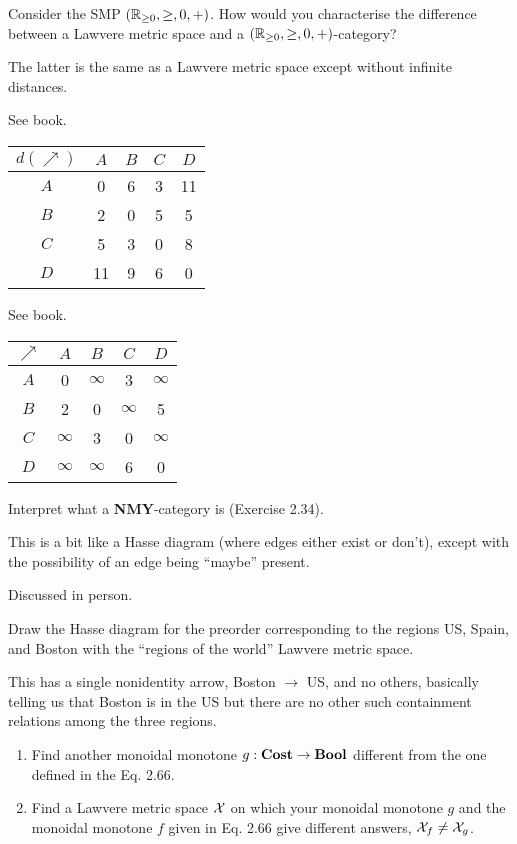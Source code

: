 Consider the SMP $(\mathbb{R}_{\geq0},\geq,0,+)$.  How would you characterise the difference between a Lawvere metric space and a $(\mathbb{R}_{\geq0},\geq,0,+)$-category?

\solution
The latter is the same as a Lawvere metric space except without infinite distances.

See book.

\solution
\begin{tabular}{c|cccc}
$d(\nearrow)$ & $A$ & $B$ & $C$ & $D$ \\
\hline$A$ & 0 & 6 & 3 & 11 \\
$B$ & 2 & 0 & 5 & 5 \\
$C$ & 5 & 3 & 0 & 8 \\
$D$ & 11 & 9 & 6 & 0
\end{tabular}

See book.

\solution
\begin{tabular}{c|cccc}
$\nearrow$ & $A$ & $B$ & $C$ & $D$ \\
\hline$A$ & 0 & $\infty$ & 3 & $\infty$ \\
$B$ & 2 & 0 & $\infty$ & 5 \\
$C$ & $\infty$ & 3 & 0 & $\infty$ \\
$D$ & $\infty$ & $\infty$ & 6 & 0
\end{tabular}

Interpret what a \textbf{NMY}-category is (Exercise 2.34).

\solution
This is a bit like a Hasse diagram (where edges either exist or don't), except with the possibility of an edge being ``maybe'' present.

Discussed in person.

Draw the Hasse diagram for the preorder corresponding to the regions US, Spain, and Boston with the ``regions of the world'' Lawvere metric space.

\solution
This has a single nonidentity arrow, Boston $\to$ US, and no others, basically telling us that Boston is in the US but there are no other such containment relations among the three regions.

\begin{enumerate}
	\item Find another monoidal monotone $g:\textbf{Cost}\to\textbf{Bool}$ different from the one defined in the Eq. 2.66.
	\item Find a Lawvere metric space $\mathcal{X}$ on which your monoidal monotone $g$ and the monoidal monotone $f$ given in Eq. 2.66 give different answers, $\mathcal{X}_f\neq \mathcal{X}_g$.
\end{enumerate}

